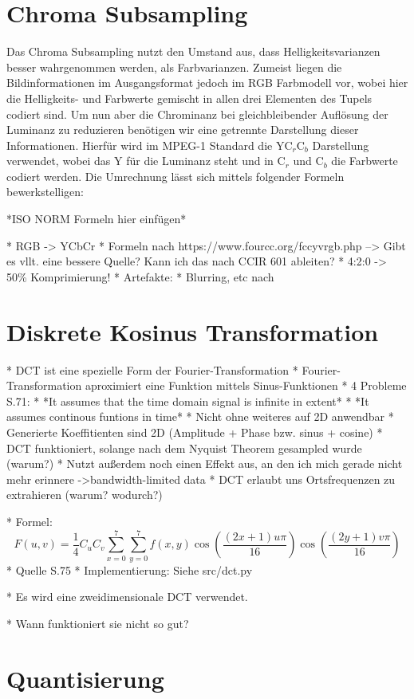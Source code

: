 
\section{Chroma Subsampling}

Das Chroma Subsampling nutzt den Umstand aus, dass Helligkeitsvarianzen besser wahrgenommen werden, als Farbvarianzen. Zumeist liegen die Bildinformationen im Ausgangsformat jedoch im RGB Farbmodell vor, wobei hier die Helligkeits- und Farbwerte gemischt in allen drei Elementen des Tupels codiert sind. Um nun aber die Chrominanz bei gleichbleibender Auflösung der Luminanz zu reduzieren benötigen wir eine getrennte Darstellung dieser Informationen. Hierfür wird im MPEG-1 Standard die YC$_r$C$_b$ Darstellung verwendet, wobei das Y für die Luminanz steht und in C$_r$ und C$_b$ die Farbwerte codiert werden. Die Umrechnung lässt sich mittels folgender Formeln bewerkstelligen:

*ISO NORM Formeln hier einfügen*



* RGB -> YCbCr
* Formeln nach https://www.fourcc.org/fccyvrgb.php --> Gibt es vllt. eine bessere Quelle? Kann ich das nach CCIR 601 ableiten?
* 4:2:0 -> 50\% Komprimierung!
* Artefakte: * Blurring, etc nach \cite{akramullah_digital_2014}



\section{Diskrete Kosinus Transformation}

* DCT ist eine spezielle Form der Fourier-Transformation
	* Fourier-Transformation aproximiert eine Funktion mittels Sinus-Funktionen
	* 4 Probleme \cite{symes_peter_digital_2004} S.71:
		* *It assumes that the time domain signal is infinite in extent*
		* *It assumes continous funtions in time*
		* Nicht ohne weiteres auf 2D anwendbar
		* Generierte Koeffitienten sind 2D (Amplitude + Phase bzw. sinus + cosine)
	* DCT funktioniert, solange nach dem Nyquist Theorem gesampled wurde (warum?)
	* Nutzt außerdem noch einen Effekt aus, an den ich mich gerade nicht mehr erinnere ->bandwidth-limited data
* DCT erlaubt uns Ortsfrequenzen zu extrahieren (warum? wodurch?)

* Formel: \[F(u,v) = \frac{1}{4} C_uC_v\sum_{x=0}^7 \sum_{y=0}^7 f(x,y) \cos \left(\frac{(2x+1)u\pi}{16}\right) \cos\left(\frac{(2y+1)v\pi}{16}\right) \]
	* Quelle \cite{symes_peter_digital_2004} S.75
* Implementierung: Siehe src/dct.py

* Es wird eine zweidimensionale DCT verwendet.

* Wann funktioniert sie nicht so gut?

\section{Quantisierung}
